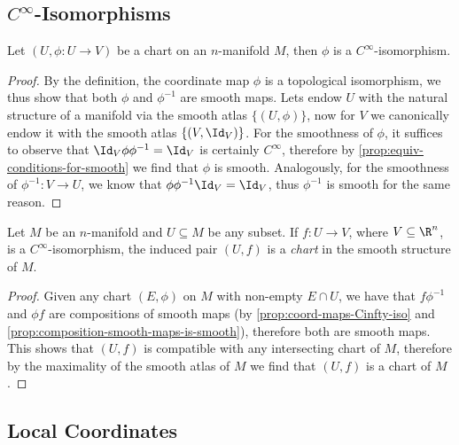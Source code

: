 \subsection{\texorpdfstring{\(C^{\infty}\)}{smooth}-Isomorphisms}

\begin{proposition}
\label{prop:coord-maps-Cinfty-iso}
Let \((U, \phi: U \to V)\) be a chart on an \(n\)-manifold \(M\), then \(\phi\)
is a \(C^\infty\)-isomorphism.
\end{proposition}

\begin{proof}
By the definition, the coordinate map \(\phi\) is a topological isomorphism, we
thus show that both \(\phi\) and \(\phi^{-1}\) are smooth maps. Lets endow \(U\)
with the natural structure of a manifold via the smooth atlas \(\{(U, \phi)\}\),
now for \(V\) we canonically endow it with the smooth atlas
\(\{(V, \Id_{V})\}\). For the smoothness of \(\phi\), it suffices to observe
that \(\Id_V \phi \phi^{-1} = \Id_V\) is certainly \(C^{\infty}\), therefore by
\cref{prop:equiv-conditions-for-smooth} we find that \(\phi\) is
smooth. Analogously, for the smoothness of \(\phi^{-1}: V \to U\), we know that
\(\phi \phi^{-1} \Id_V = \Id_V\), thus \(\phi^{-1}\) is smooth for the same
reason.
\end{proof}

\begin{proposition}
\label{prop:smooth-iso-is-charts}
Let \(M\) be an \(n\)-manifold and \(U \subseteq M\) be any subset. If
\(f: U \to V\), where \(V \subseteq \R^n\), is a \(C^{\infty}\)-isomorphism, the
induced pair \((U, f)\) is a \emph{chart} in the smooth structure of \(M\).
\end{proposition}

\begin{proof}
Given any chart \((E, \phi)\) on \(M\) with non-empty \(E \cap U\), we have that
\(f \phi^{-1}\) and \(\phi f\) are compositions of smooth maps (by
\cref{prop:coord-maps-Cinfty-iso} and
\cref{prop:composition-smooth-maps-is-smooth}), therefore both are smooth
maps. This shows that \((U, f)\) is compatible with any intersecting chart of
\(M\), therefore by the maximality of the smooth atlas of \(M\) we find that
\((U, f)\) is a chart of \(M\).
\end{proof}

\subsection{Local Coordinates}

